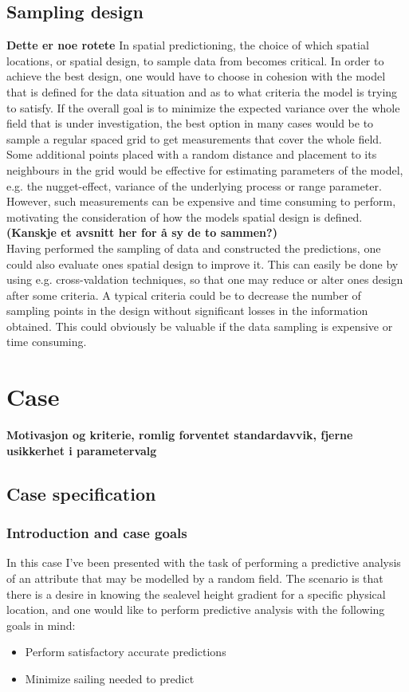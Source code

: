 \documentclass{article}
\begin{document}
\subsection{Sampling design} 
\label{sec:sampling_design}
\textbf{Dette er noe rotete}
In spatial predictioning, the choice of which spatial locations, or spatial design, to sample data from becomes critical. In order to achieve the best design, one would have to choose in cohesion with the model that is defined for the data situation and as to what criteria the model is trying to satisfy. If the overall goal is to minimize the expected variance over the whole field that is under investigation, the best option in many cases would be to sample a regular spaced grid to get measurements that cover the whole field. Some additional points placed with a random distance and placement to its neighbours in the grid would be effective for estimating parameters of the model, e.g. the nugget-effect, variance of the underlying process or range parameter. However, such measurements can be expensive and time consuming to perform, motivating the consideration of how the models spatial design is defined. \\

\textbf{(Kanskje et avsnitt her for å sy de to sammen?)} \\

Having performed the sampling of data and constructed the predictions, one could also evaluate ones spatial design to improve it. This can easily be done by using e.g. cross-valdation techniques, so that one may reduce or alter ones design after some criteria. A typical criteria could be to decrease the number of sampling points in the design without significant losses in the information obtained. This could obviously be valuable if the data sampling is expensive or time consuming.  

\section{Case}
\textbf{Motivasjon og kriterie, romlig forventet standardavvik, fjerne usikkerhet i parametervalg} \\
\subsection{Case specification} 
\subsubsection{Introduction and case goals} \label{subs:goals}
In this case I've been presented with the task of performing a predictive analysis of an attribute that may be modelled by a random field. The scenario is that there is a desire in knowing the sealevel height gradient for a specific physical location, and one would like to perform predictive analysis with the following goals in mind:
\begin{itemize} 
\item Perform satisfactory accurate predictions
\item Minimize sailing needed to predict
\end{itemize} 
\end{document}
